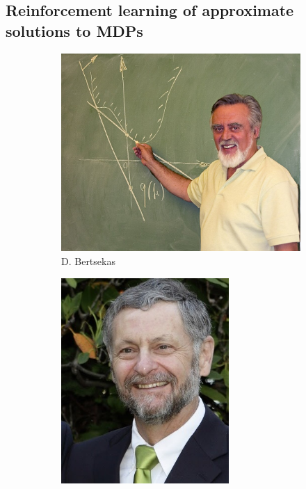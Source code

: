 \subsection{Reinforcement learning of approximate solutions to MDPs}
\begin{figure}
    \centering
    \begin{subfigure}[b]{0.22\textwidth}
        \centering
        \includegraphics[width=\textwidth]{images/images_intro/Dimitri_Wiki_Pict.jpg}
        \caption{D. Bertsekas}
    \end{subfigure}
    \hfill
    \begin{subfigure}[b]{0.22\textwidth}
        \centering
        \includegraphics[width=0.7\textwidth]{images/images_intro/puterman.jpg}

\end{subfigure}
\end{figure}
